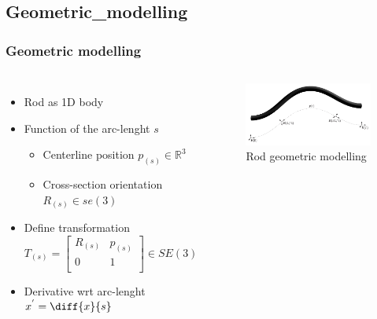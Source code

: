 \documentclass[compress]{thesisbeamer}
\begin{document}
        	\subsection{Geometric_modelling}
        	\begin{frame}
        		\frametitle{Geometric modelling}
				\begin{columns}
				\begin{itemize}%
  					\item Rod as 1D body 
  					\item Function of the arc-lenght $ s $
  					\begin{itemize}%
   						\item Centerline position $ p_{(s)}\in\mathbb{R}^3$
   						\item Cross-section orientation $ R_{(s)}\in\textit{se}(3)  $
  					\end{itemize}
  					\item Define transformation
  					\begin{equation}
  						T_{(s)} = 
  						\begin{bmatrix}
  							R_{(s)} & p_{(s)} 	\\
  								0	&	1		\\
  						\end{bmatrix}\in SE(3)
  					\end{equation}
  					\item Derivative wrt arc-lenght $ x^{'} = \diff{x}{s} $
 				\end{itemize}
				\vspace{2cm}
				\begin{figure}[h]
					\centering
					\includegraphics[width=\textwidth]{images/rod_geometry}
					\caption{Rod geometric modelling}
				\end{figure}
				\end{columns}
			\end{frame}
\end{document}
